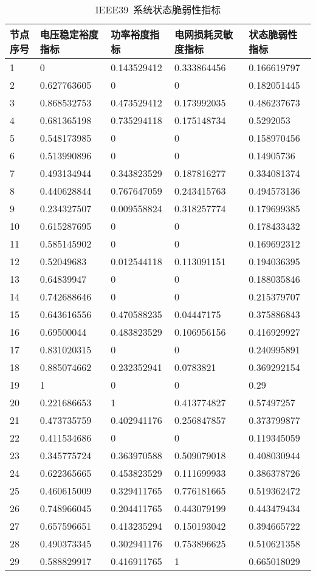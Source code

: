 \begin{table}[H]
  \centering
  \caption{IEEE39~系统状态脆弱性指标}
  \label{tab:chap5:Index_frabric39}
  \begin{tabular}{C{1.5cm}C{2.75cm}C{2.75cm}C{3.25cm}C{2.75cm}}
  \toprule
  \textbf{节点序号} & \textbf{电压稳定裕度指标} & \textbf{功率裕度指标} & \textbf{电网损耗灵敏度指标} & \textbf{状态脆弱性指标} \\
   & 0 & 0.143529412 & 0.333864456 & 0.166619797 \\ 
  2 & 0.627763605 & 0 & 0 & 0.182051445 \\ 
  3 & 0.868532753 & 0.473529412 & 0.173992035 & 0.486237673 \\ 
  4 & 0.681365198 & 0.735294118 & 0.175148734 & 0.5292053 \\ 
  5 & 0.548173985 & 0 & 0 & 0.158970456 \\ 
  6 & 0.513990896 & 0 & 0 & 0.14905736 \\ 
  7 & 0.493134944 & 0.343823529 & 0.187816277 & 0.334081374 \\ 
  8 & 0.440628844 & 0.767647059 & 0.243415763 & 0.494573136 \\ 
  9 & 0.234327507 & 0.009558824 & 0.318257774 & 0.179699385 \\ 
  10 & 0.615287695 & 0 & 0 & 0.178433432 \\ 
  11 & 0.585145902 & 0 & 0 & 0.169692312 \\ 
  12 & 0.52049683 & 0.012544118 & 0.113091151 & 0.194036395 \\
  13 & 0.64839947 & 0 & 0 & 0.188035846 \\ 
  14 & 0.742688646 & 0 & 0 & 0.215379707 \\
  15 & 0.643616556 & 0.470588235 & 0.04447175 & 0.375886843 \\ 
  16 & 0.69500044 & 0.483823529 & 0.106956156 & 0.416929927 \\ 
  17 & 0.831020315 & 0 & 0 & 0.240995891 \\
  18 & 0.885074662 & 0.232352941 & 0.0783821 & 0.369292154 \\ 
  19 & 1 & 0 & 0 & 0.29 \\ 
  20 & 0.221686653 & 1 & 0.413774827 & 0.57497257 \\ 
  21 & 0.473735759 & 0.402941176 & 0.256847857 & 0.373799877 \\ 
  22 & 0.411534686 & 0 & 0 & 0.119345059 \\ 
  23 & 0.345775724 & 0.363970588 & 0.509079018 & 0.408030944 \\ 
  24 & 0.622365665 & 0.453823529 & 0.111699933 & 0.386378726 \\ 
  25 & 0.460615009 & 0.329411765 & 0.776181665 & 0.519362472 \\ 
  26 & 0.748966045 & 0.204411765 & 0.443079199 & 0.443479434 \\ 
  27 & 0.657596651 & 0.413235294 & 0.150193042 & 0.394665722 \\ 
  28 & 0.490373345 & 0.302941176 & 0.753896625 & 0.510621358 \\ 
  29 & 0.588829917 & 0.416911765 & 1 & 0.665018029 \\ 
  

\end{tabular}
\end{table}
